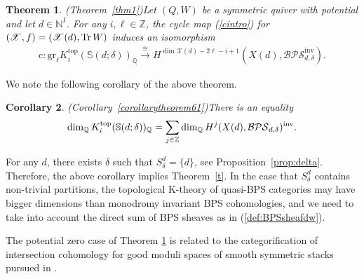 \documentclass [11pt,oneside,a4paper,mathscr]{amsart}
\newtheorem{thm}{Theorem}[section]
\newtheorem{cor}[thm]{Corollary}
\theoremstyle{definition}
\newcommand{\X}{\mathscr{X}}
\newcommand{\Tr}{\mathop{\rm Tr}}
\begin{document}
\begin{thm}\emph{(Theorem~\ref{thm1})}\label{thmintro1}
Let $(Q, W)$ be a symmetric quiver with potential
and let $d\in \mathbb{N}^I$. 
For any $i, \ell\in\mathbb{Z}$, 
the cycle map (\ref{cintro}) for $(\X, f)=(\X(d), \Tr W)$ induces an isomorphism 
\begin{align*}\label{m2}
   \mathrm{c}\colon \mathrm{gr}_\ell K_i^{\mathrm{top}}\left(\mathbb{S}(d; \delta)\right)_{\mathbb{Q}}\stackrel{\cong}{\to} H^{\dim\X(d)-2\ell-i+1}(X(d), \mathcal{BPS}_{d,\delta}^{\mathrm{inv}}).
\end{align*}
\end{thm}
We note the following corollary of the above theorem. 
\begin{cor}\emph{(Corollary~\ref{corollarytheorem61})}\label{cor:dimequal}
There is an equality 
\begin{align*}
    \dim_{\mathbb{Q}} K_i^{\rm{top}}(\mathbb{S}(d; \delta))_{\mathbb{Q}}=
    \sum_{j\in \mathbb{Z}}\dim_{\mathbb{Q}}H^j(X(d), \mathcal{BPS}_{d, \delta})^{\rm{inv}}. 
    \end{align*}
    \end{cor}
For any $d$, there exists $\delta$ such that 
$S_{\delta}^d=\{d\}$, see Proposition~\ref{prop:delta}. 
Therefore, the above corollary implies Theorem~\ref{t}. 
In the case that $S_{\delta}^d$
contains non-trivial partitions, the topological K-theory 
of quasi-BPS categories may have bigger dimensions 
than monodromy invariant BPS cohomologies, and we need 
to take into account the direct sum of BPS sheaves as in (\ref{def:BPSsheafdw}). 

The potential zero case of Theorem \ref{thmintro1} is related to the categorification of intersection cohomology for good moduli spaces of smooth symmetric stacks pursued in \cite{P3}.
\end{document}
